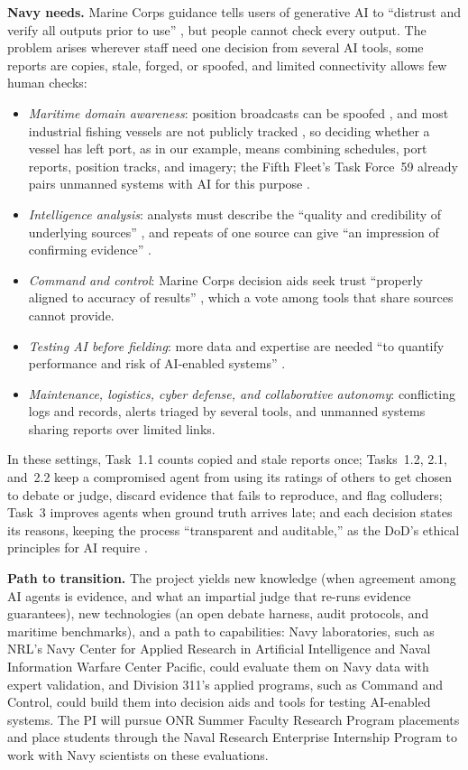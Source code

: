 \documentclass[12pt,letterpaper]{article}
\newcommand{\hd}[1]{\ifhmode\par\fi\addvspace{1pt}\noindent\textbf{#1}\hspace{0.35em}}
\begin{document}
\hd{Navy needs.} Marine Corps guidance tells users of generative AI to ``distrust and verify all outputs prior to use'' \citep{freedberg2025usmc}, but people cannot check every output. The problem arises wherever staff need one decision from several AI tools, some reports are copies, stale, forged, or spoofed, and limited connectivity allows few human checks:
\begin{itemize}
\item \emph{Maritime domain awareness}: position broadcasts can be spoofed \citep{marad2024ais}, and most industrial fishing vessels are not publicly tracked \citep{paolo2024satellite}, so deciding whether a vessel has left port, as in our example, means combining schedules, port reports, position tracks, and imagery; the Fifth Fleet's Task Force~59 already pairs unmanned systems with AI for this purpose \citep{navcent2021tf59}.
\item \emph{Intelligence analysis}: analysts must describe the ``quality and credibility of underlying sources'' \citep{odni2015icd203}, and repeats of one source can give ``an impression of confirming evidence'' \citep{wmd2005report}.
\item \emph{Command and control}: Marine Corps decision aids seek trust ``properly aligned to accuracy of results'' \citep{onr2026tacticalai}, which a vote among tools that share sources cannot provide.
\item \emph{Testing AI before fielding}: more data and expertise are needed ``to quantify performance and risk of AI-enabled systems'' \citep{dote2026annual}.
\item \emph{Maintenance, logistics, cyber defense, and collaborative autonomy}: conflicting logs and records, alerts triaged by several tools, and unmanned systems sharing reports over limited links.
\end{itemize}
In these settings, Task~1.1 counts copied and stale reports once; Tasks~1.2, 2.1, and~2.2 keep a compromised agent from using its ratings of others to get chosen to debate or judge, discard evidence that fails to reproduce, and flag colluders; Task~3 improves agents when ground truth arrives late; and each decision states its reasons, keeping the process ``transparent and auditable,'' as the DoD's ethical principles for AI require \citep{dod2020ethics}.

\hd{Path to transition.} The project yields new knowledge (when agreement among AI agents is evidence, and what an impartial judge that re-runs evidence guarantees), new technologies (an open debate harness, audit protocols, and maritime benchmarks), and a path to capabilities: Navy laboratories, such as NRL's Navy Center for Applied Research in Artificial Intelligence and Naval Information Warfare Center Pacific, could evaluate them on Navy data with expert validation, and Division 311's applied programs, such as Command and Control, could build them into decision aids and tools for testing AI-enabled systems. The PI will pursue ONR Summer Faculty Research Program placements and place students through the Naval Research Enterprise Internship Program to work with Navy scientists on these evaluations.
\end{document}
